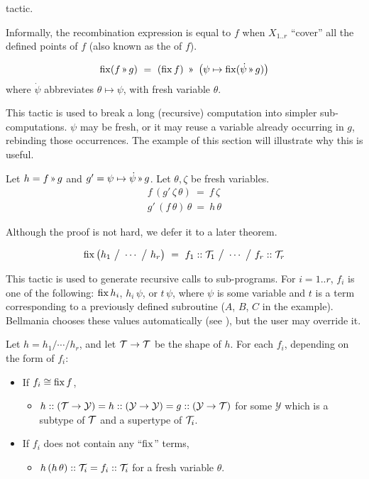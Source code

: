 \Obligations tactic.

Informally, the recombination expression is equal to $f$
when $X_{1..r}$ ``cover'' all the defined points of $f$ (also known as the  of $f$).

 \label{tactics:Stratify}
\[\fix (f\applt g) ~=~ (\fix f) ~\applt~ \big(\psi\mapsto \fix (\dot\psi\applt g)\big)\]
%
where $\dot\psi$ abbreviates $\theta\mapsto\psi$, with fresh variable $\theta$.

This tactic is used to break a long (recursive) computation into simpler sub-computations.
$\psi$ may be fresh, or it may reuse a variable already occurring in $g$, rebinding those occurrences.
The example of this section will illustrate why this is useful.

\Obligations Let $h=f\applt g$ and $g'=\psi\mapsto\dot\psi\applt g$. Let $\theta,\zeta$ be
fresh variables.
\begin{equation}
\renewcommand\arraystretch{1.5}
\begin{array}{l}
f\,(g'\,\zeta\,\theta) ~=~ f\,\zeta \\
g'\,(f\,\theta)\,\theta ~=~ h\,\theta
\end{array}
\label{tactics:Stratify obligations}
\end{equation}

Although the proof is not hard, we defer it to a later theorem.

 \label{tactics:Synth}
\[\operatorname{fix}\big(h_1 ~\big/~ \cdots ~\big/~ h_r\big) ~=~ 
  f_1 :: \mathcal{T}_1 ~\big/~ \cdots ~\big/~ f_r :: \mathcal{T}_r\]

This tactic is used to generate recursive calls to sub-programs. For $i=1..r$, $f_i$
is one of the following: $\operatorname{fix} h_i$, $h_i\,\psi$, or $t\,\psi$, where $\psi$ is some
variable and $t$ is a term corresponding to a previously defined subroutine
($A$, $B$, $C$ in the example).
Bellmania chooses these values automatically (see ),
but the user may override it.

\newcommand\Y{\mathcal{Y}}

\Obligations Let $h=h_1/\cdots/h_r$, and let $\mathcal{T}\to\mathcal{T}$ be the shape of $h$. 
  For each $f_i$, depending on the form of $f_i$:
\begin{itemize}
  \item If $f_i \cong \operatorname{fix} f$,
  \begin{itemize}
    \item $h :: (\T \to \Y) = h :: (\Y \to \Y) = g :: (\Y \to \T)$
    for some $\Y$ which is a subtype of $\mathcal{T}$ and a supertype of $\mathcal{T}_i$.
  \end{itemize}
  \item If $f_i$ does not contain any ``$\operatorname{fix}$'' terms,
  \begin{itemize}
    \item $h\,(h\,\theta) :: \mathcal{T}_i = f_i :: \mathcal{T}_i$ for a fresh variable $\theta$.
  \end{itemize}
\end{itemize}

